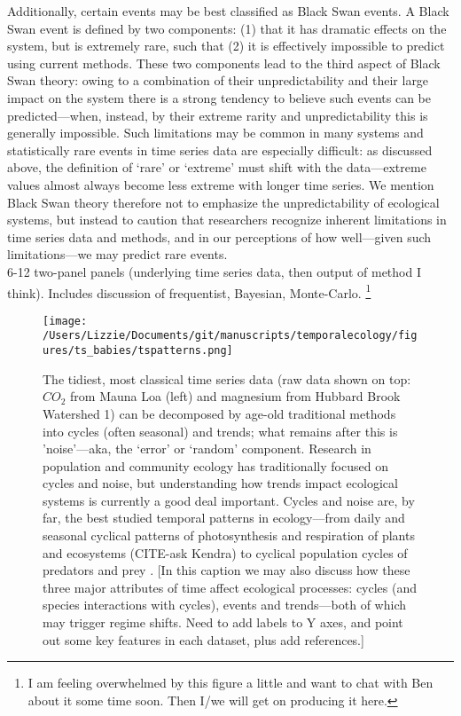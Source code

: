 \documentclass[11pt,a4paper,oneside]{article}
\begin{document}
Additionally, certain events may be best classified as Black Swan events. A Black Swan event is defined by two components: (1) that it has dramatic effects on the system, but is extremely rare, such that (2) it is effectively impossible to predict using current methods. These two components lead to the third aspect of Black Swan theory: owing to a combination of their unpredictability and their large impact on the system there is a strong tendency to believe such events can be predicted---when, instead, by their extreme rarity and unpredictability this is generally impossible. Such limitations may be common in many systems and statistically rare events in time series data are especially difficult: as discussed above, the definition of `rare' or `extreme' must shift with the data---extreme values almost always become less extreme with longer time series. We mention Black Swan theory therefore not to emphasize the unpredictability of ecological systems, but instead to caution that researchers recognize inherent limitations in time series data and methods, and in our perceptions of how well---given such limitations---we may predict rare events. \\

6-12 two-panel panels (underlying time series data, then output of method I think). Includes discussion of frequentist, Bayesian, Monte-Carlo. \footnote{I am feeling overwhelmed by this figure a little and want to chat with Ben about it some time soon. Then I/we will get on producing it here. }

\clearpage
\newpage
\begin{figure}[h!]
\centering
\noindent \texttt{[image: /Users/Lizzie/Documents/git/manuscripts/temporalecology/figures/ts\_babies/tspatterns.png]}
\caption{The tidiest, most classical time series data (raw data shown on top: \(CO_{2}\) from Mauna Loa (left) and magnesium from Hubbard Brook Watershed 1) can be decomposed by age-old traditional methods into cycles (often seasonal) and trends; what remains after this is 'noise'---aka, the `error' or `random' component. Research in population and community ecology has traditionally focused on cycles and noise, but understanding how trends impact ecological systems is currently a good deal important. Cycles and noise are, by far, the best studied temporal patterns in ecology---from daily and seasonal cyclical patterns of photosynthesis and respiration of plants \citep{Lambers:2008jb} and ecosystems (CITE-ask Kendra) to cyclical population cycles of predators and prey \citep{Krebs2001}. [In this caption we may also discuss how these three major attributes of time affect ecological processes: cycles (and species interactions with cycles), events and trends---both of which may trigger regime shifts. Need to add labels to Y axes, and point out some key features in each dataset, plus add references.] \label{decompfig}}
\end{figure} %
\end{document}
